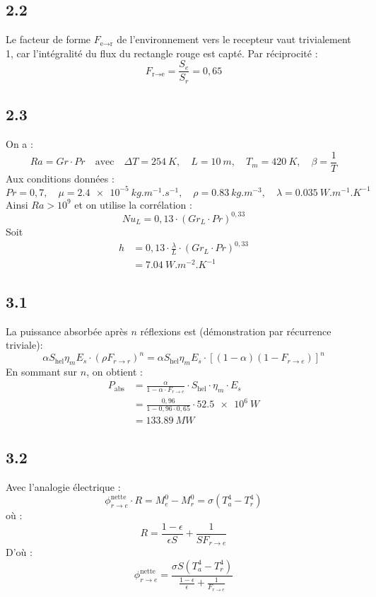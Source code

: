 \documentclass[12pt]{article}
\begin{document}
\subsection*{2.2}
Le facteur de forme \( F_{\text{e} \rightarrow \text{r}} \) de l'environnement vers le recepteur vaut trivialement 1, car l'intégralité du flux du rectangle rouge est capté. Par réciprocité :
\[
F_{\text{r} \rightarrow \text{e}} = \frac{S_e}{S_r} = \boxed{0{,}65}
\]

\subsection*{2.3}
On a :
\[
Ra = Gr \cdot Pr
\quad \text{avec} \quad 
\Delta T = \SI{254}{K},\quad L = \SI{10}{m},\quad T_m = \SI{420}{K},\quad \beta = \frac{1}{T}
\]
Aux conditions données :
\[
Pr = 0{,}7,\quad \mu = \SI{2,4e-5}{kg.m^{-1}.s^{-1}},\quad \rho = \SI{0,83}{kg.m^{-3}}, \quad \lambda = \SI{0,035}{W.m^{-1}.K^{-1}}
\]
Ainsi $Ra > 10^9$ et on utilise la corrélation :
\[
Nu_L = 0{,}13 \cdot (Gr_L \cdot Pr)^{0{,}33}
\]
Soit 
\begin{align*}
h &= 0{,}13 \cdot \frac{\lambda}{L} \cdot (Gr_L \cdot Pr)^{0{,}33} \\
&= \boxed{\SI{7,04}{W.m^{-2}.K^{-1}}}
\end{align*}

\subsection*{3.1}
La puissance absorbée après \( n \) réflexions est (démonstration par récurrence triviale):
\[
\alpha S_{\text{hel}} \eta_m E_s \cdot (\rho F_{r \rightarrow r})^n = \alpha S_{\text{hel}} \eta_m E_s \cdot \left[(1 - \alpha)(1 - F_{r \rightarrow e})\right]^n
\]
En sommant sur \( n \), on obtient :
\begin{align*}
P_{\text{abs}} &= \frac{\alpha}{1 - \alpha \cdot F_{r \rightarrow e}} \cdot S_{\text{hel}} \cdot \eta_m \cdot E_s \\
&= \frac{0{,}96}{1 - 0{,}96 \cdot 0{,}65} \cdot \SI{52.5e6}{W} \\
&= \boxed{\SI{133,89}{MW}}
\end{align*}

\subsection*{3.2}
Avec l'analogie électrique :
\[
\phi^{\text{nette}}_{r \rightarrow e} \cdot R = M^0_e - M^0_r = \sigma \left(T_a^4 - T_r^4\right)
\]
où :
\[
R = \frac{1 - \epsilon}{\epsilon S} + \frac{1}{S F_{r \rightarrow e}}
\]
D'où :
\[
\phi^{\text{nette}}_{r \rightarrow e} = \frac{\sigma S (T_a^4 - T_r^4)}{\frac{1 - \epsilon}{\epsilon} + \frac{1}{F_{r \rightarrow e}}}
\]
\end{document}
